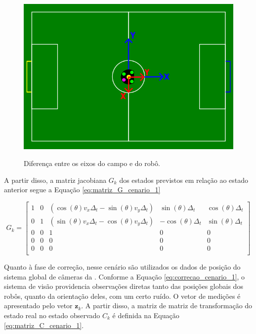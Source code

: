 \documentclass[acronym, symbols, table]{fei}
\begin{document}
			\begin{figure}[!htb]
				\centering
				\caption{Diferença entre os eixos do campo e do robô.}
				\includegraphics[width=1.0\textwidth]{representacao_eixos_robo_campo.png}
				\label{fig:representacao_eixos_robo_campo}
			\end{figure}
		
			 A partir disso, a matriz jacobiana $G_k$ dos estados previstos em relação ao estado anterior segue a Equação \ref{eq:matriz_G_cenario_1}
		
			\begin{equation}\label{eq:matriz_G_cenario_1}
			 	G_{k} = \begin{bmatrix}
			 		1 & 0 & (\cos(\theta)v_x\Delta_t - \sin(\theta)v_y\Delta_t) & \sin(\theta)\Delta_t & \cos(\theta)\Delta_t \\
			 		0 & 1 & (\sin(\theta)v_x\Delta_t - \cos(\theta)v_y\Delta_t) & -\cos(\theta)\Delta_t & \sin(\theta)\Delta_t \\
			 		0 & 0 & 1 & 0 & 0 \\
			 		0 & 0 & 0 & 0 & 0 \\
			 		0 & 0 & 0 & 0 & 0 \\
			 	\end{bmatrix}
			 \end{equation}
		 
			 Quanto à fase de correção, nesse cenário são utilizados os dados de posição do sistema global de câmeras da . Conforme a Equação \ref{eq:correcao_cenario_1}, o sistema de visão providencia observações diretas tanto das posições globais dos robôs, quanto da orientação deles, com um certo ruído. O vetor de medições é apresentado pelo vetor $\textbf{z}_k$. A partir disso, a matriz de matriz de transformação do estado real no estado observado $C_k$ é definida na Equação \ref{eq:matriz_C_cenario_1}.
			 
\end{document}
